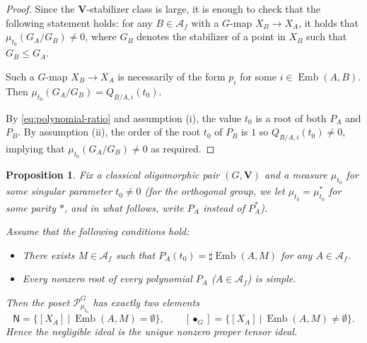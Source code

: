 \documentclass[11pt,a4paper]{amsart}
\theoremstyle{plain}%
\newtheorem{proposition}[lemma]{Proposition}
\theoremstyle{definition}
\theoremstyle{remark}
\newcommand{\V}{\mathbf{V}}
\newcommand{\Emb}{\operatorname{Emb}}
\begin{document}
\begin{proof}
Since the $\V$-stabilizer class is large, it is enough to check that the following statement holds: for any $B\in \mathcal{A}_f$ with a $G$-map $X_B\to X_A$, it holds that $\mu_{t_0}(G_A/G_B)\neq 0$, where $G_B$ denotes the stabilizer of a point in $X_B$ such that $G_B\leq {G_A}$.

Such a $G$-map $X_B\to X_A$ is necessarily of the form $p_i$ for some $i\in \Emb(A, B)$. Then $ \mu_{t_0}(G_A/G_B) = Q_{B/A,i}(t_0)$. 

By \eqref{eq:polynomial-ratio} and assumption (i), the value $t_0$ is a root of both $P_A$ and $P_B$. By assumption (ii), the order of the root $t_0$ of $P_B$ is $1$ so $ Q_{B/A,i}(t_0) \neq 0$, implying that $ \mu_{t_0}(G_A/G_B) \neq 0$ as required.


\end{proof}



\begin{proposition}
    \label{thm:finite-model}
    Fix a classical oligomorphic pair $(G, \V)$ and a measure $\mu_{t_0}$ for some singular parameter $t_0\neq 0$ (for the orthogonal group, we let $\mu_{t_0}=\mu_{t_0}^*$ for some parity $*$, and in what follows, write $P_A$ instead of $P_A^*$).
    
Assume that the following conditions hold:
\begin{itemize}
    \item There exists $M\in \mathcal{A}_f$ such that $P_A(t_0) = \sharp\Emb(A, M)$ for any $A\in \mathcal{A}_f$.
\item Every nonzero root of every polynomial $P_A$ ($A\in \mathcal{A}_f$) is simple.
\end{itemize}
Then the poset $\mathcal{P}_{\mu_{t_0}}^G$ has exactly two elements
\[
 \mathsf N=\{[X_A] \ \vert \  \Emb(A, M)=\emptyset\},\qquad
 [\bullet_G]=\{[X_A]  \ \vert \ \Emb(A, M)\neq \emptyset\}.
\]
Hence the negligible ideal is the unique nonzero proper tensor ideal.
\end{proposition}
\end{document}
